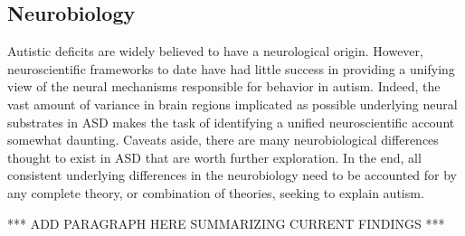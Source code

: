 \subsection{Neurobiology}

Autistic deficits are widely believed to have a neurological origin.  However, neuroscientific frameworks to date have had little success in providing a unifying view of the neural mechanisms responsible for behavior in autism.   Indeed, the vast amount of variance in brain regions implicated as possible underlying neural substrates in ASD makes the task of identifying a unified neuroscientific account somewhat daunting. Caveats aside, there are many neurobiological differences thought to exist in ASD that are worth further exploration. In the end, all consistent underlying differences in the neurobiology need to be accounted for by any complete theory, or combination of theories, seeking to explain autism.

*** ADD PARAGRAPH HERE SUMMARIZING CURRENT FINDINGS *** 


